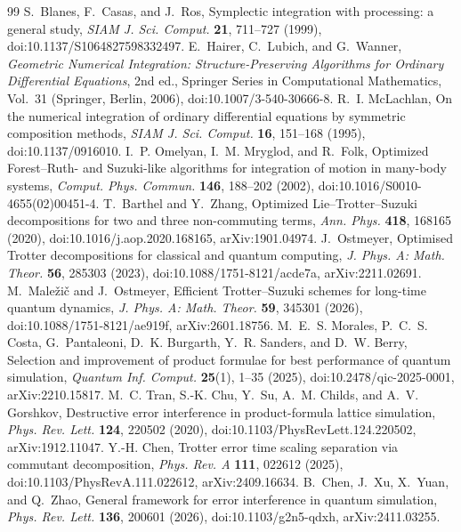 \documentclass[11pt]{article}
\theoremstyle{plain}
\theoremstyle{definition}
\theoremstyle{remark}
\begin{document}
\begin{thebibliography}{99}
 S.~Blanes, F.~Casas, and J.~Ros, Symplectic integration with processing: a general study, \emph{SIAM J. Sci. Comput.} \textbf{21}, 711--727 (1999), doi:10.1137/S1064827598332497.
 E.~Hairer, C.~Lubich, and G.~Wanner, \emph{Geometric Numerical Integration: Structure-Preserving Algorithms for Ordinary Differential Equations}, 2nd ed., Springer Series in Computational Mathematics, Vol.~31 (Springer, Berlin, 2006), doi:10.1007/3-540-30666-8.
 R.~I. McLachlan, On the numerical integration of ordinary differential equations by symmetric composition methods, \emph{SIAM J. Sci. Comput.} \textbf{16}, 151--168 (1995), doi:10.1137/0916010.
 I.~P. Omelyan, I.~M. Mryglod, and R.~Folk, Optimized Forest--Ruth- and Suzuki-like algorithms for integration of motion in many-body systems, \emph{Comput. Phys. Commun.} \textbf{146}, 188--202 (2002), doi:10.1016/S0010-4655(02)00451-4.
 T.~Barthel and Y.~Zhang, Optimized Lie--Trotter--Suzuki decompositions for two and three non-commuting terms, \emph{Ann. Phys.} \textbf{418}, 168165 (2020), doi:10.1016/j.aop.2020.168165, arXiv:1901.04974.
 J.~Ostmeyer, Optimised Trotter decompositions for classical and quantum computing, \emph{J. Phys. A: Math. Theor.} \textbf{56}, 285303 (2023), doi:10.1088/1751-8121/acde7a, arXiv:2211.02691.
 M.~Male\v{z}i\v{c} and J.~Ostmeyer, Efficient Trotter--Suzuki schemes for long-time quantum dynamics, \emph{J. Phys. A: Math. Theor.} \textbf{59}, 345301 (2026), doi:10.1088/1751-8121/ae919f, arXiv:2601.18756.
 M.~E.~S. Morales, P.~C.~S. Costa, G.~Pantaleoni, D.~K. Burgarth, Y.~R. Sanders, and D.~W. Berry, Selection and improvement of product formulae for best performance of quantum simulation, \emph{Quantum Inf. Comput.} \textbf{25}(1), 1--35 (2025), doi:10.2478/qic-2025-0001, arXiv:2210.15817.
 M.~C. Tran, S.-K. Chu, Y.~Su, A.~M. Childs, and A.~V. Gorshkov, Destructive error interference in product-formula lattice simulation, \emph{Phys. Rev. Lett.} \textbf{124}, 220502 (2020), doi:10.1103/PhysRevLett.124.220502, arXiv:1912.11047.
 Y.-H. Chen, Trotter error time scaling separation via commutant decomposition, \emph{Phys. Rev. A} \textbf{111}, 022612 (2025), doi:10.1103/PhysRevA.111.022612, arXiv:2409.16634.
 B.~Chen, J.~Xu, X.~Yuan, and Q.~Zhao, General framework for error interference in quantum simulation, \emph{Phys. Rev. Lett.} \textbf{136}, 200601 (2026), doi:10.1103/g2n5-qdxh, arXiv:2411.03255.

\end{thebibliography}
\end{document}

